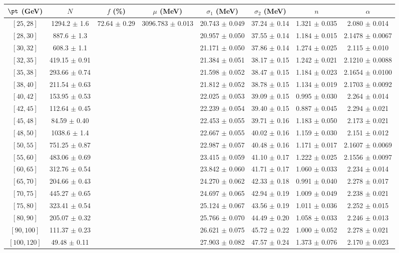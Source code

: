 \begin{tabular}{c||c|c|c|c|c|c|c}
$\pt$ (GeV) & $N$ & $f$ (\%) & $\mu$ (MeV) & $\sigma_1$ (MeV) & $\sigma_2$ (MeV) & $n$ & $\alpha$ \\
\hline
$[25, 28]$ & 1294.2 $\pm$ 1.6 & \multirow{19}{*}{72.64 $\pm$ 0.29} & \multirow{19}{*}{3096.783 $\pm$ 0.013} & 20.743 $\pm$ 0.049 & 37.24 $\pm$ 0.14 & 1.321 $\pm$ 0.035 & 2.080 $\pm$ 0.014\\
$[28, 30]$ & 887.6 $\pm$ 1.3 &  &  & 20.957 $\pm$ 0.050 & 37.55 $\pm$ 0.14 & 1.184 $\pm$ 0.015 & 2.1478 $\pm$ 0.0067\\
$[30, 32]$ & 608.3 $\pm$ 1.1 &  &  & 21.171 $\pm$ 0.050 & 37.86 $\pm$ 0.14 & 1.274 $\pm$ 0.025 & 2.115 $\pm$ 0.010\\
$[32, 35]$ & 419.15 $\pm$ 0.91 &  &  & 21.384 $\pm$ 0.051 & 38.17 $\pm$ 0.15 & 1.242 $\pm$ 0.021 & 2.1210 $\pm$ 0.0088\\
$[35, 38]$ & 293.66 $\pm$ 0.74 &  &  & 21.598 $\pm$ 0.052 & 38.47 $\pm$ 0.15 & 1.184 $\pm$ 0.023 & 2.1654 $\pm$ 0.0100\\
$[38, 40]$ & 211.54 $\pm$ 0.63 &  &  & 21.812 $\pm$ 0.052 & 38.78 $\pm$ 0.15 & 1.134 $\pm$ 0.019 & 2.1703 $\pm$ 0.0092\\
$[40, 42]$ & 153.95 $\pm$ 0.53 &  &  & 22.025 $\pm$ 0.053 & 39.09 $\pm$ 0.15 & 0.995 $\pm$ 0.030 & 2.264 $\pm$ 0.014\\
$[42, 45]$ & 112.64 $\pm$ 0.45 &  &  & 22.239 $\pm$ 0.054 & 39.40 $\pm$ 0.15 & 0.887 $\pm$ 0.045 & 2.294 $\pm$ 0.021\\
$[45, 48]$ & 84.59 $\pm$ 0.40 &  &  & 22.453 $\pm$ 0.055 & 39.71 $\pm$ 0.16 & 1.183 $\pm$ 0.050 & 2.173 $\pm$ 0.021\\
$[48, 50]$ & 1038.6 $\pm$ 1.4 &  &  & 22.667 $\pm$ 0.055 & 40.02 $\pm$ 0.16 & 1.159 $\pm$ 0.030 & 2.151 $\pm$ 0.012\\
$[50, 55]$ & 751.25 $\pm$ 0.87 &  &  & 22.987 $\pm$ 0.057 & 40.48 $\pm$ 0.16 & 1.171 $\pm$ 0.017 & 2.1607 $\pm$ 0.0069\\
$[55, 60]$ & 483.06 $\pm$ 0.69 &  &  & 23.415 $\pm$ 0.059 & 41.10 $\pm$ 0.17 & 1.222 $\pm$ 0.025 & 2.1556 $\pm$ 0.0097\\
$[60, 65]$ & 312.76 $\pm$ 0.54 &  &  & 23.842 $\pm$ 0.060 & 41.71 $\pm$ 0.17 & 1.060 $\pm$ 0.033 & 2.234 $\pm$ 0.014\\
$[65, 70]$ & 204.66 $\pm$ 0.43 &  &  & 24.270 $\pm$ 0.062 & 42.33 $\pm$ 0.18 & 0.991 $\pm$ 0.040 & 2.278 $\pm$ 0.017\\
$[70, 75]$ & 445.27 $\pm$ 0.65 &  &  & 24.697 $\pm$ 0.065 & 42.94 $\pm$ 0.19 & 1.009 $\pm$ 0.049 & 2.238 $\pm$ 0.021\\
$[75, 80]$ & 323.41 $\pm$ 0.54 &  &  & 25.124 $\pm$ 0.067 & 43.56 $\pm$ 0.19 & 1.011 $\pm$ 0.036 & 2.252 $\pm$ 0.015\\
$[80, 90]$ & 205.07 $\pm$ 0.32 &  &  & 25.766 $\pm$ 0.070 & 44.49 $\pm$ 0.20 & 1.058 $\pm$ 0.033 & 2.246 $\pm$ 0.013\\
$[90, 100]$ & 111.37 $\pm$ 0.23 &  &  & 26.621 $\pm$ 0.075 & 45.72 $\pm$ 0.22 & 1.000 $\pm$ 0.052 & 2.278 $\pm$ 0.021\\
$[100, 120]$ & 49.48 $\pm$ 0.11 &  &  & 27.903 $\pm$ 0.082 & 47.57 $\pm$ 0.24 & 1.373 $\pm$ 0.076 & 2.170 $\pm$ 0.023\\
\end{tabular}
